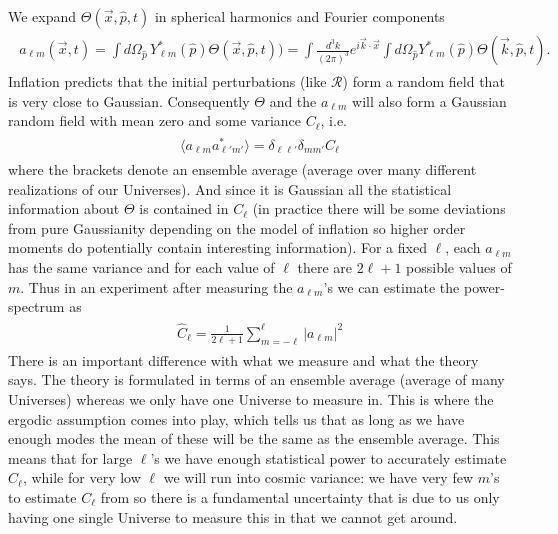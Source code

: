We expand $\Theta(\vec{x}, \hat{p}, t)$ in spherical harmonics and Fourier components
{\small\begin{align}
\begin{aligned}
    a_{\ell m}(\vec{x}, t)=\int d \Omega_{\hat{p}}\, Y_{\ell m}^{*}(\hat{p}) \Theta(\vec{x}, \hat{p}, t) )=\int \frac{d^{3} k}{(2 \pi)^{3}} e^{i \vec{k} \cdot \vec{x}} \int d \Omega_{\hat{p}} Y_{\ell m}^{*}(\hat{p}) \Theta(\vec{k}, \hat{p}, t).
\end{aligned}
\end{align}}
Inflation predicts that the initial perturbations (like $\mathcal{R}$) form a random field that is very close to Gaussian.
Consequently $\Theta$ and the $a_{\ell m}$ will also form a Gaussian random field with mean zero and some variance $C_{\ell}$, i.e.
{\small\begin{align}
\begin{aligned}
    \langle a_{\ell m} a^{*}_{\ell' m'}\rangle = \delta_{\ell\ell'}\delta_{mm'} C_{\ell}
\end{aligned}
\end{align}}
where the brackets denote an ensemble average (average over many different realizations of our Universes).
And since it is Gaussian all the statistical information about $\Theta$ is contained in $C_{\ell}$ (in practice there will be some deviations from pure Gaussianity depending on the model of inflation so higher order moments do potentially contain interesting information).
For a fixed $\ell$, each $a_{\ell m}$ has the same variance and for each value of $\ell$ there are $2\ell+1$ possible values of $m$.
Thus in an experiment after measuring the $a_{\ell m}$'s we can estimate the power-spectrum as
{\small\begin{align}
\begin{aligned}
    \hat{C}_{\ell}=\frac{1}{2\ell+1}\sum_{m=-\ell}^{\ell} |a_{\ell m}|^{2}
\end{aligned}
\end{align}}
There is an important difference with what we measure and what the theory says.
The theory is formulated in terms of an ensemble average (average of many Universes) whereas we only have one Universe to measure in.
This is where the ergodic assumption comes into play, which tells us that as long as we have enough modes the mean of these will be the same as the ensemble average.
This means that for large $\ell$'s we have enough statistical power to accurately estimate $C_{\ell}$, while for very low $\ell$ we will run into cosmic variance: we have very few $m$'s to estimate $C_{\ell}$ from so there is a fundamental uncertainty that is due to us only having one single Universe to measure this in that we cannot get around.
